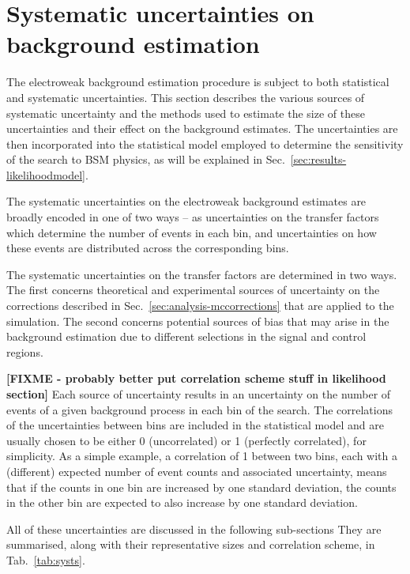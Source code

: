 \section{Systematic uncertainties on background estimation}
\label{sec:analysis-systematics}
The electroweak background estimation procedure is subject to both statistical 
and 
systematic uncertainties. This section describes the various sources of 
systematic uncertainty and the methods used to estimate the size of these 
uncertainties and their effect on the background estimates. The uncertainties 
are then incorporated into the statistical model employed to determine the 
sensitivity of the search to BSM physics, as will be explained in 
Sec.~\ref{sec:results-likelihoodmodel}.

The systematic uncertainties on the electroweak background estimates are 
broadly encoded in one of two ways -- as uncertainties on the transfer factors 
which determine the number of events in each \njnbht bin, and uncertainties on 
how these events are distributed across the corresponding \mht bins. 

The systematic uncertainties on the transfer factors are determined in two 
ways. The first concerns theoretical and experimental sources of uncertainty on 
the corrections described in Sec.~\ref{sec:analysis-mccorrections} that are 
applied to the simulation. The second concerns potential sources of 
bias that may arise in the background estimation due to different selections in 
the signal and control regions. 

\textbf{[FIXME - probably better put correlation scheme stuff in likelihood 
section]}
Each source of uncertainty results in an uncertainty on the number of events of 
a given background process in each bin of the search. The correlations of the 
uncertainties between bins are included in the statistical model and are 
usually chosen to be either 
0 (uncorrelated) or 1 (perfectly correlated), for simplicity. As a simple 
example, a correlation of 1 between two bins, each with a (different) expected 
number of event counts and associated uncertainty, means that if the counts in 
one bin are increased by one standard deviation, the counts in the other bin 
are expected to also increase by one standard deviation.

All of these uncertainties are discussed in the following sub-sections
They are summarised, along with their representative sizes and correlation 
scheme, in Tab.~\ref{tab:systs}.

